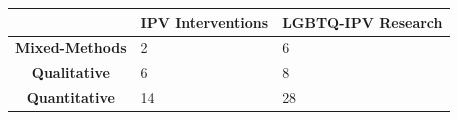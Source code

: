 \documentclass[]{tufte-handout}
\begin{document}
\begin{longtable}[]{@{}cll@{}}
\toprule
\begin{minipage}[b]{0.25\columnwidth}\centering\strut
~\strut
\end{minipage} & \begin{minipage}[b]{0.25\columnwidth}\raggedright\strut
IPV Interventions\strut
\end{minipage} & \begin{minipage}[b]{0.25\columnwidth}\raggedright\strut
LGBTQ-IPV Research\strut
\end{minipage}\tabularnewline
\midrule
\endhead
\begin{minipage}[t]{0.25\columnwidth}\centering\strut
\textbf{Mixed-Methods}\strut
\end{minipage} & \begin{minipage}[t]{0.25\columnwidth}\raggedright\strut
2\strut
\end{minipage} & \begin{minipage}[t]{0.25\columnwidth}\raggedright\strut
6\strut
\end{minipage}\tabularnewline
\begin{minipage}[t]{0.25\columnwidth}\centering\strut
\textbf{Qualitative}\strut
\end{minipage} & \begin{minipage}[t]{0.25\columnwidth}\raggedright\strut
6\strut
\end{minipage} & \begin{minipage}[t]{0.25\columnwidth}\raggedright\strut
8\strut
\end{minipage}\tabularnewline
\begin{minipage}[t]{0.25\columnwidth}\centering\strut
\textbf{Quantitative}\strut
\end{minipage} & \begin{minipage}[t]{0.25\columnwidth}\raggedright\strut
14\strut
\end{minipage} & \begin{minipage}[t]{0.25\columnwidth}\raggedright\strut
28\strut
\end{minipage}\tabularnewline
\bottomrule
\end{longtable}
\end{document}

